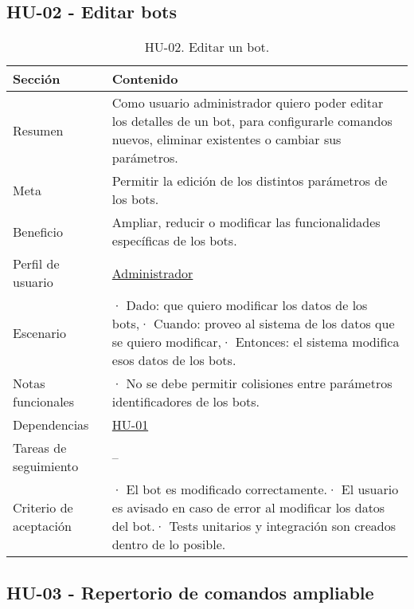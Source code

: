 \subsection{HU-02 - Editar bots}
\label{sec:hu02}

\begin{table}[H]
    \centering
    \def\arraystretch{1.25}
    \begin{adjustbox}{max width=\textwidth}
    \begin{tabularx}{\textwidth}{|l|L|}
    \hline
        \textbf{Sección} & \textbf{Contenido} \\ \hline
    \hline
        Resumen & Como usuario administrador quiero poder editar los detalles de un bot, para configurarle comandos nuevos, eliminar existentes o cambiar sus parámetros. \\ \hline
        Meta & Permitir la edición de los distintos parámetros de los bots. \\ \hline
        Beneficio & Ampliar, reducir o modificar las funcionalidades específicas de los bots. \\ \hline
        Perfil de usuario & \hyperref[sec:personaAdmin]{Administrador} \\ \hline
        Escenario & · Dado: que quiero modificar los datos de los bots,\linebreak · Cuando: proveo al sistema de los datos que se quiero modificar,\linebreak · Entonces: el sistema modifica esos datos de los bots. \\ \hline
        Notas funcionales & · No se debe permitir colisiones entre parámetros identificadores de los bots. \\ \hline
        Dependencias & \hyperref[sec:hu01]{HU-01} \\ \hline
        Tareas de seguimiento & – \\ \hline
        Criterio de aceptación & · El bot es modificado correctamente.\linebreak · El usuario es avisado en caso de error al modificar los datos del bot.\linebreak · Tests unitarios y integración son creados dentro de lo posible. \\ \hline
    \end{tabularx}
    \end{adjustbox}
    \caption{HU-02. Editar un bot.}
\end{table}


\subsection{HU-03 - Repertorio de comandos ampliable}
\label{sec:hu03}

